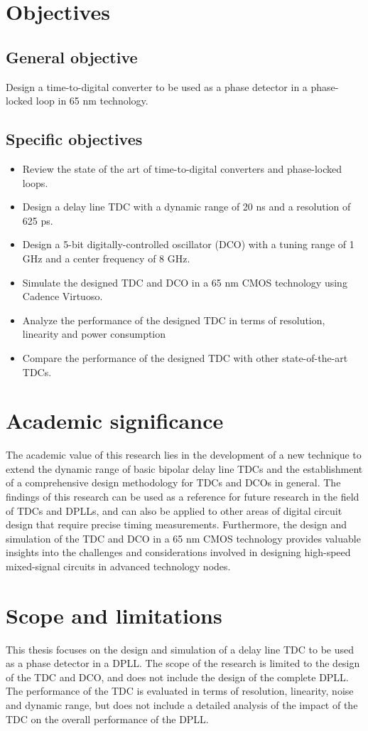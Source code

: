 \section{Objectives}
\subsection{General objective}
Design a time-to-digital converter to be used as a phase detector in a phase-locked loop in 65 nm technology.
\subsection{Specific objectives}
\begin{itemize}
    \item Review the state of the art of time-to-digital converters and phase-locked loops.
    \item Design a delay line TDC with a dynamic range of 20 ns and a resolution of 625 ps.
    \item Design a 5-bit digitally-controlled oscillator (DCO) with a tuning range of 1 GHz and a center frequency of 8 GHz.
    \item Simulate the designed TDC and DCO in a 65 nm CMOS technology using Cadence Virtuoso.
    \item Analyze the performance of the designed TDC in terms of resolution, linearity and power consumption
    \item Compare the performance of the designed TDC with other state-of-the-art TDCs.
\end{itemize}

\section{Academic significance}
The academic value of this research lies in the development of a new technique to extend the dynamic range of basic bipolar delay line TDCs and the establishment of a comprehensive design methodology for TDCs and DCOs in
general. The findings of this research can be used as a reference for future research in the field of TDCs and DPLLs, and can also be applied to other areas of digital circuit design that require precise
timing measurements. Furthermore, the design and simulation of the TDC and DCO in a 65 nm CMOS technology provides valuable insights into the challenges and considerations involved in designing high-speed
mixed-signal circuits in advanced technology nodes.

\section{Scope and limitations}
This thesis focuses on the design and simulation of a delay line TDC to be used as a phase detector in a DPLL. The scope of the research is limited to the design of the TDC and DCO, and does not include the
design of the complete DPLL. The performance of the TDC is evaluated in terms of resolution, linearity, noise and dynamic range, but does not include a detailed analysis of the impact of the TDC on the overall
performance of the DPLL.

